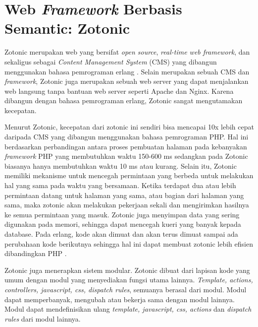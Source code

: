 \section{Web \textit{Framework} Berbasis Semantic: Zotonic}


Zotonic merupakan web yang bersifat \textit{open source}, \textit{real-time web framework}, dan sekaligus sebagai \textit{Content Management System} (CMS) yang dibangun menggunakan bahasa pemrograman erlang \citep{zotonic.overview}. Selain merupakan sebuah CMS dan \textit{framework}, Zotonic juga merupakan sebuah web server yang dapat menjalankan web langsung tanpa bantuan web server seperti Apache dan Nginx. Karena dibangun dengan bahasa pemrograman erlang, Zotonic sangat mengutamakan kecepatan.

Menurut Zotonic, kecepatan dari zotonic ini sendiri bisa mencapai 10x lebih cepat daripada CMS yang dibangun menggunakan bahasa pemrograman PHP. Hal ini berdasarkan perbandingan antara proses pembuatan halaman pada kebanyakan \textit{framework} PHP yang membutuhkan waktu 150-600 ms sedangkan pada Zotonic biasanya hanya membutuhkan waktu 10 ms atau kurang. Selain itu, Zotonic memiliki mekanisme untuk mencegah permintaan yang berbeda untuk melakukan hal yang sama pada waktu yang bersamaan. Ketika terdapat dua atau lebih permintaan datang untuk halaman yang sama, atau bagian dari halaman yang sama, maka zotonic akan melakukan pekerjaan sekali dan mengirimkan hasilnya ke semua permintaan yang masuk. Zotonic juga menyimpan data yang sering digunakan pada memori, sehingga dapat mencegah kueri yang banyak kepada database. Pada erlang, kode akan dimuat dan akan terus dimuat sampai ada perubahaan kode berikutnya sehingga hal ini dapat membuat zotonic lebih efisien dibandingkan PHP \citep{zotonic.speed}.

Zotonic juga menerapkan sistem modular. Zotonic dibuat dari lapisan kode yang umum dengan modul yang menyediakan fungsi utama lainnya. \textit{Template, actions, controllers, javascript, css, dispatch rules}, semuanya berasal dari modul. Modul dapat memperbanyak, mengubah atau bekerja sama dengan modul lainnya. Modul dapat mendefinisikan ulang \textit{template, javascript, css, actions} dan \textit{dispatch rules} dari modul lainnya.

